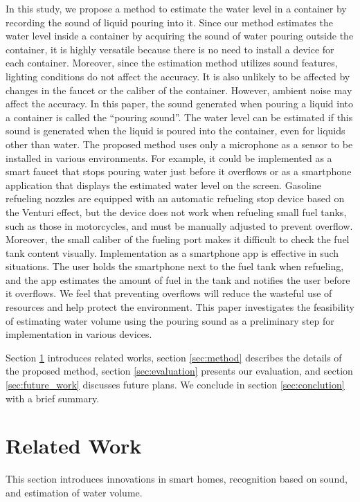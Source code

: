 \documentclass[sigconf]{acmart}
\begin{document}
In this study, we propose a method to estimate the water level in a container by recording the sound of liquid pouring into it. Since our method estimates the water level inside a container by acquiring the sound of water pouring outside the container, it is highly versatile because there is no need to install a device for each container. Moreover, since the estimation method utilizes sound features, lighting conditions do not affect the accuracy. It is also unlikely to be affected by changes in the faucet or the caliber of the container. However, ambient noise may affect the accuracy. In this paper, the sound generated when pouring a liquid into a container is called the ``pouring sound''. The water level can be estimated if this sound is generated when the liquid is poured into the container, even for liquids other than water. The proposed method uses only a microphone as a sensor to be installed in various environments. For example, it could be implemented as a smart faucet that stops pouring water just before it overflows or as a smartphone application that displays the estimated water level on the screen. Gasoline refueling nozzles are equipped with an automatic refueling stop device based on the Venturi effect, but the device does not work when refueling small fuel tanks, such as those in motorcycles, and must be manually adjusted to prevent overflow. Moreover, the small caliber of the fueling port makes it difficult to check the fuel tank content visually. Implementation as a smartphone app is effective in such situations. The user holds the smartphone next to the fuel tank when refueling, and the app estimates the amount of fuel in the tank and notifies the user before it overflows. We feel that preventing overflows will reduce the wasteful use of resources and help protect the environment. This paper investigates the feasibility of estimating water volume using the pouring sound as a preliminary step for implementation in various devices.\par

Section \ref{sec:related} introduces related works, section \ref{sec:method} describes the details of the proposed method, section \ref{sec:evaluation} presents our evaluation, and section \ref{sec:future_work} discusses future plans. We conclude in section \ref{sec:conclution} with a brief summary.



\section{Related Work}
\label{sec:related}
This section introduces innovations in smart homes, recognition based on sound, and estimation of water volume.
\end{document}
